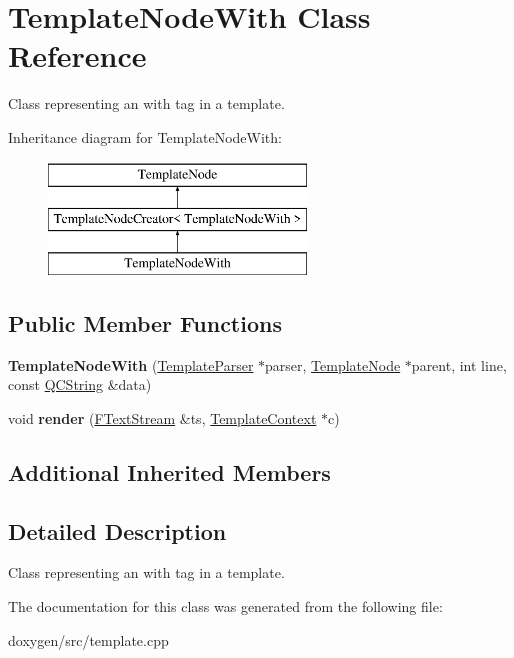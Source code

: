 \hypertarget{class_template_node_with}{}\section{Template\+Node\+With Class Reference}
\label{class_template_node_with}


Class representing an \textquotesingle{}with\textquotesingle{} tag in a template.  


Inheritance diagram for Template\+Node\+With\+:\begin{figure}[H]
\begin{center}
\leavevmode
\includegraphics[height=3.000000cm]{class_template_node_with}
\end{center}
\end{figure}
\subsection*{Public Member Functions}
\begin{DoxyCompactItemize}
\item 
\mbox{\label{class_template_node_with_afc4fcb9701bd7c780587f80ef43f14b9}} 
{\bfseries Template\+Node\+With} (\mbox{\hyperlink{class_template_parser}{Template\+Parser}} $\ast$parser, \mbox{\hyperlink{class_template_node}{Template\+Node}} $\ast$parent, int line, const \mbox{\hyperlink{class_q_c_string}{Q\+C\+String}} \&data)
\item 
\mbox{\label{class_template_node_with_ade1b5c7aefb2cc588f96955b6af5ec4d}} 
void {\bfseries render} (\mbox{\hyperlink{class_f_text_stream}{F\+Text\+Stream}} \&ts, \mbox{\hyperlink{class_template_context}{Template\+Context}} $\ast$c)
\end{DoxyCompactItemize}
\subsection*{Additional Inherited Members}


\subsection{Detailed Description}
Class representing an \textquotesingle{}with\textquotesingle{} tag in a template. 

The documentation for this class was generated from the following file\+:\begin{DoxyCompactItemize}
\item 
doxygen/src/template.\+cpp\end{DoxyCompactItemize}
